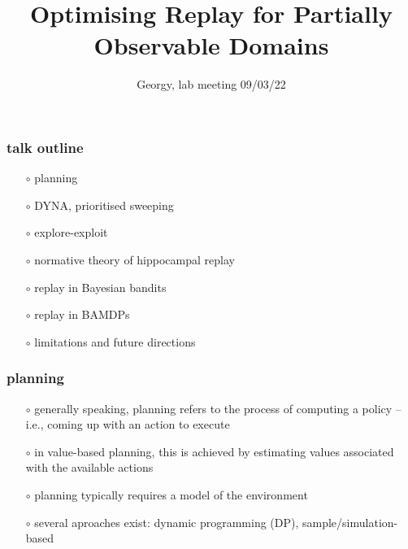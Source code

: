 \documentclass[aspectratio=169]{beamer}
\title{Optimising Replay for Partially Observable Domains}
\subtitle{Georgy, lab meeting 09/03/22}
\date{}
\begin{document}
\begin{frame}
    \titlepage


\end{frame}

\begin{frame}
    \frametitle{talk outline}
    \begin{itemize}
        \item[$\circ$] planning
        \item[$\circ$] DYNA, prioritised sweeping
        \item[$\circ$] explore-exploit
        \item[$\circ$] normative theory of hippocampal replay
        \item[$\circ$] replay in Bayesian bandits
        \item[$\circ$] replay in BAMDPs
        \item[$\circ$] limitations and future directions
    \end{itemize}

\end{frame}

\begin{frame}
    \frametitle{planning}
    \begin{itemize}
        \item[$\circ$] generally speaking, planning refers to the process of computing a policy -- i.e., coming up with an action to execute
        \item[$\circ$] in value-based planning, this is achieved by estimating values associated with the available actions 
        \item[$\circ$] planning typically requires a model of the environment 
        \item[$\circ$] several aproaches exist: dynamic programming (DP), sample/simulation-based
    \end{itemize}
\end{frame}
\end{document}
